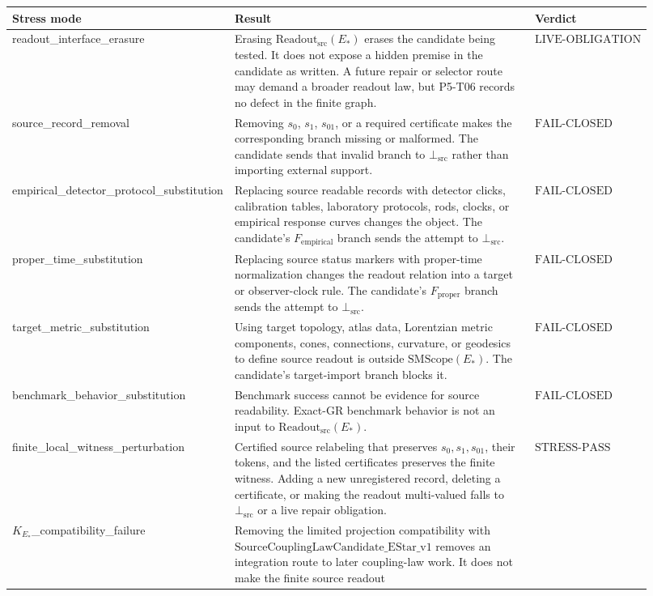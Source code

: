 \documentclass[11pt]{article}
\newcommand{\EStar}{E_{\ast}}
\newcommand{\SMScope}{\mathrm{SMScope}}
\newcommand{\ReadoutSrc}{\mathrm{Readout}_{\mathrm{src}}}
\newcommand{\BottomSrc}{\bot_{\mathrm{src}}}
\newcommand{\StressPass}{\mathrm{STRESS}\mbox{-}\mathrm{PASS}}
\newcommand{\FailClosed}{\mathrm{FAIL}\mbox{-}\mathrm{CLOSED}}
\newcommand{\LiveObligation}{\mathrm{LIVE}\mbox{-}\mathrm{OBLIGATION}}
\begin{document}
\begin{longtable}{p{0.30\linewidth}p{0.48\linewidth}p{0.14\linewidth}}
\toprule
Stress mode & Result & Verdict \\
\midrule
readout\_interface\_erasure &
Erasing \(\ReadoutSrc(\EStar)\) erases the candidate being tested. It does
not expose a hidden premise in the candidate as written. A future repair or
selector route may demand a broader readout law, but P5-T06 records no
defect in the finite graph. & \(\LiveObligation\) \\
source\_record\_removal &
Removing \(s_0\), \(s_1\), \(s_{01}\), or a required certificate makes the
corresponding branch missing or malformed. The candidate sends that invalid
branch to \(\BottomSrc\) rather than importing external support. &
\(\FailClosed\) \\
empirical\_detector\_protocol\_substitution &
Replacing source readable records with detector clicks, calibration tables,
laboratory protocols, rods, clocks, or empirical response curves changes the
object. The candidate's \(F_{\mathrm{empirical}}\) branch sends the attempt to
\(\BottomSrc\). & \(\FailClosed\) \\
proper\_time\_substitution &
Replacing source status markers with proper-time normalization changes the
readout relation into a target or observer-clock rule. The candidate's
\(F_{\mathrm{proper}}\) branch sends the attempt to \(\BottomSrc\). &
\(\FailClosed\) \\
target\_metric\_substitution &
Using target topology, atlas data, Lorentzian metric components, cones,
connections, curvature, or geodesics to define source readout is outside
\(\SMScope(\EStar)\). The candidate's target-import branch blocks it. &
\(\FailClosed\) \\
benchmark\_behavior\_substitution &
Benchmark success cannot be evidence for source readability. Exact-GR
benchmark behavior is not an input to \(\ReadoutSrc(\EStar)\). &
\(\FailClosed\) \\
finite\_local\_witness\_perturbation &
Certified source relabeling that preserves \(s_0,s_1,s_{01}\), their tokens,
and the listed certificates preserves the finite witness. Adding a new
unregistered record, deleting a certificate, or making the readout
multi-valued falls to \(\BottomSrc\) or a live repair obligation. &
\(\StressPass\) \\
\(K_{E_{\ast}}\)\_compatibility\_failure &
Removing the limited projection compatibility with
\(\mathrm{SourceCouplingLawCandidate\_EStar\_v1}\) removes an integration
route to later coupling-law work. It does not make the finite source readout

\end{longtable}
\end{document}
